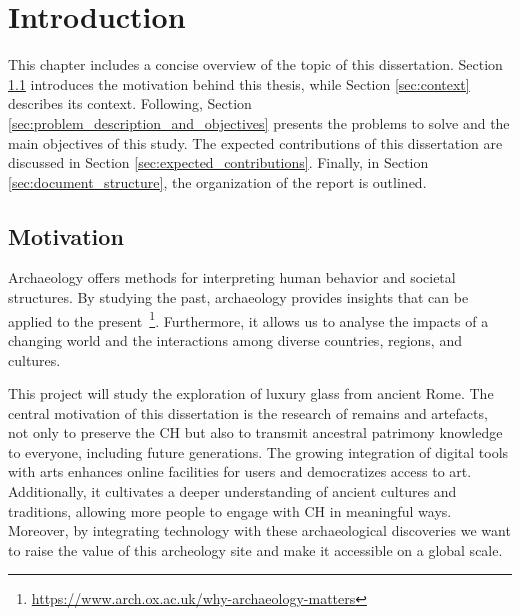 
%

\chapter{Introduction}
\label{cha:introduction}

This chapter includes a concise overview of the topic of this dissertation. 
Section \ref{sec:motivation} introduces the motivation behind this thesis, while Section \ref{sec:context} describes its context.
Following, Section \ref{sec:problem_description_and_objectives} presents the problems to solve and the main objectives of this study. 
The expected contributions of this dissertation are discussed in Section \ref{sec:expected_contributions}.
Finally, in Section \ref{sec:document_structure}, the organization of the report is outlined.

\section{Motivation}
\label{sec:motivation}
Archaeology offers methods for interpreting human behavior and societal structures. By studying the past, archaeology provides insights that can be applied to the present~\footnote{\url{https://www.arch.ox.ac.uk/why-archaeology-matters}}.
Furthermore, it allows us to analyse the impacts of a changing world and the interactions among diverse countries, regions, and cultures.

This project will study the exploration of luxury glass from ancient Rome.
The central motivation of this dissertation is the research of remains and artefacts, not
only to preserve the \gls{CH} but also to transmit ancestral patrimony knowledge to everyone, including future generations. 
The growing integration of digital tools with arts enhances online 
facilities for users and democratizes access to art. Additionally, it cultivates a deeper understanding of ancient cultures and traditions, allowing more people to engage with
\gls{CH} in meaningful ways. Moreover, by integrating technology with these archaeological 
discoveries we want to raise the value of this archeology site and make it accessible on a global scale.


